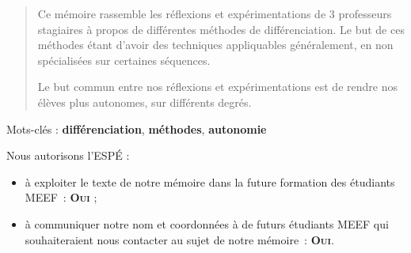 \begin{abstract}
Ce mémoire rassemble les réflexions et expérimentations de 3 professeurs stagiaires
à propos de différentes méthodes de différenciation. Le but de ces méthodes
étant d'avoir des techniques appliquables généralement, en non spécialisées sur
certaines séquences.

Le but commun entre nos réflexions et expérimentations est de rendre nos élèves
plus autonomes, sur différents degrés.
\end{abstract}

Mots-clés : \textbf{différenciation}, \textbf{méthodes}, \textbf{autonomie}

\vfill

Nous autorisons l'ESPÉ :
\begin{itemize}
\item à exploiter le texte de notre mémoire dans la future formation des étudiants MEEF : \textbf{\textsc{Oui}} ;
\item à communiquer notre nom et coordonnées à de futurs étudiants MEEF qui souhaiteraient nous contacter au sujet de notre mémoire : \textbf{\textsc{Oui}}.
\end{itemize}
